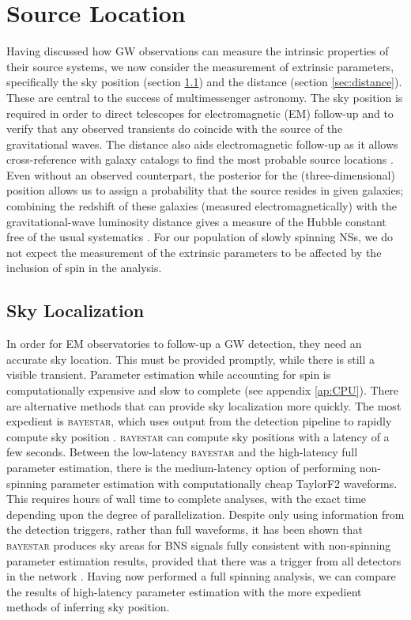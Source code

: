 \section{Source Location}\label{sec:extrinsic}

Having discussed how GW observations can measure the intrinsic properties of their source systems, we now consider the measurement of extrinsic parameters, specifically the sky position (section \ref{sec:sky}) and the distance (section \ref{sec:distance}). These are central to the success of multimessenger astronomy. The sky position is required in order to direct telescopes for electromagnetic (EM) follow-up and to verify that any observed transients do coincide with the source of the gravitational waves. The distance also aids electromagnetic follow-up as it allows cross-reference with galaxy catalogs to find the most probable source locations \citep{Nissanke_2012,Hanna:2013,Fan_2014,Blackburn:2014rqa}. Even without an observed counterpart, the posterior for the (three-dimensional) position allows us to assign a probability that the source resides in given galaxies; combining the redshift of these galaxies (measured electromagnetically) with the gravitational-wave luminosity distance gives a measure of the Hubble constant free of the usual systematics \citep{Schutz_1986,Del_Pozzo_2012}. For our population of slowly spinning NSs, we do not expect the measurement of the extrinsic parameters to be affected by the inclusion of spin in the analysis.

\subsection{Sky Localization}\label{sec:sky}

In order for EM observatories to follow-up a GW detection, they need an accurate sky location. This must be provided promptly, while there is still a visible transient. Parameter estimation while accounting for spin is computationally expensive and slow to complete (see appendix \ref{ap:CPU}). There are alternative methods that can provide sky localization more quickly. The most expedient is \textsc{bayestar}, which uses output from the detection pipeline to rapidly compute sky position \citep{SingerPrice2015}. \textsc{bayestar} can compute sky positions with a latency of a few seconds. Between the low-latency \textsc{bayestar} and the high-latency full parameter estimation, there is the medium-latency option of performing non-spinning parameter estimation with computationally cheap TaylorF2 waveforms. This requires hours of wall time to complete analyses, with the exact time depending upon the degree of parallelization. Despite only using information from the detection triggers, rather than full waveforms, it has been shown that \textsc{bayestar} produces sky areas for BNS signals fully consistent with non-spinning parameter estimation results, provided that there was a trigger from all detectors in the network \citep{Singer_2014,Berry_2014,SingerPrice2015}. Having now performed a full spinning analysis, we can compare the results of high-latency parameter estimation with the more expedient methods of inferring sky position.

